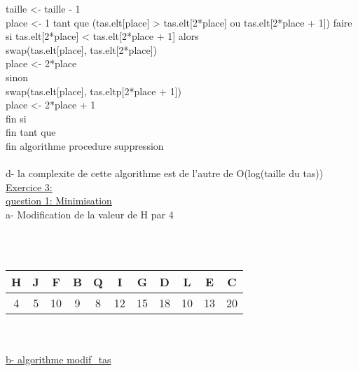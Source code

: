 \documentclass [11pt]{report}
\begin{document}
\indent taille <- taille - 1\\
\indent place <- 1
\indent tant que (tas.elt[place] > tas.elt[2*place] ou tas.elt[2*place + 1]) faire \\
\indent \indent si tas.elt[2*place] < tas.elt[2*place + 1] alors\\
\indent \indent \indent	swap(tas.elt[place], tas.elt[2*place])\\
\indent \indent \indent	place <- 2*place\\
\indent \indent	sinon\\
\indent \indent \indent	swap(tas.elt[place], tas.eltp[2*place + 1])\\
\indent \indent \indent	place <- 2*place + 1\\
\indent \indent	fin si\\
\indent fin tant que\\
fin algorithme procedure suppression\\
\vspace{5mm}\\
 d- la complexite de cette algorithme est de l'autre de O(log(taille du tas))
 \vspace{10mm}\\
 \underline{{\huge Exercice 3:}}\\
\underline{question 1: Minimisation}\\
\indent a- Modification de la valeur de H par 4\\
\\
\vspace{2mm}\\
\begin{tabular}{|c|c|c|c|c|c|c|c|c|c|c|}
\hline H & J & F  & B & Q & I  & G  &  D & L  & E  & C \\ 
\hline 4 & 5 & 10 & 9 & 8 & 12 & 15 & 18 & 10 & 13 & 20 \\ 
\hline 
\end{tabular} \\
\vspace{5mm}\\
\indent \underline{ b- algorithme modif\_tas}\\
\end{document}
